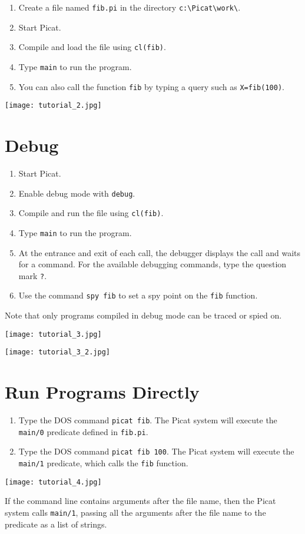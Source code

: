 \documentclass{article}[12pt]
\begin{document}
\begin{enumerate}
\item Create a file named \texttt{fib.pi} in the directory \verb+c:\Picat\work\+.
\item Start Picat.
\item Compile and load the file using \texttt{cl(fib)}.
\item Type \texttt{main} to run the program.
\item You can also call the function {\tt fib} by typing a query such as \verb+X=fib(100)+.
\end{enumerate}

\texttt{[image: tutorial\_2.jpg]}

\clearpage

\section*{\Large{Debug}}
\begin{enumerate}
\item Start Picat.
\item Enable debug mode with \texttt{debug}.
\item Compile and run the file using \texttt{cl(fib)}.
\item Type \texttt{main} to run the program.
\item At the entrance and exit of each call, the debugger displays the call and waits for a command. For the available debugging commands, type the question mark \texttt{?}.
\item Use the command \texttt{spy fib} to set a spy point on the \texttt{fib} function.
\end{enumerate}
Note that only programs compiled in debug mode can be traced or spied on. 

\texttt{[image: tutorial\_3.jpg]}

\texttt{[image: tutorial\_3\_2.jpg]}

\section*{\Large{Run Programs Directly}}
\begin{enumerate}
\item Type the DOS command \texttt{picat fib}. The Picat system will execute the \texttt{main/0} predicate defined in \texttt{fib.pi}.

\item Type the DOS command \texttt{picat fib 100}. The Picat system will execute the \texttt{main/1} predicate, which calls the \texttt{fib} function.
\end{enumerate}

\texttt{[image: tutorial\_4.jpg]}

If the command line contains arguments after the file name, then the Picat system calls \texttt{main/1}, passing all the arguments after the file name to the predicate as a list of strings.
\end{document}
